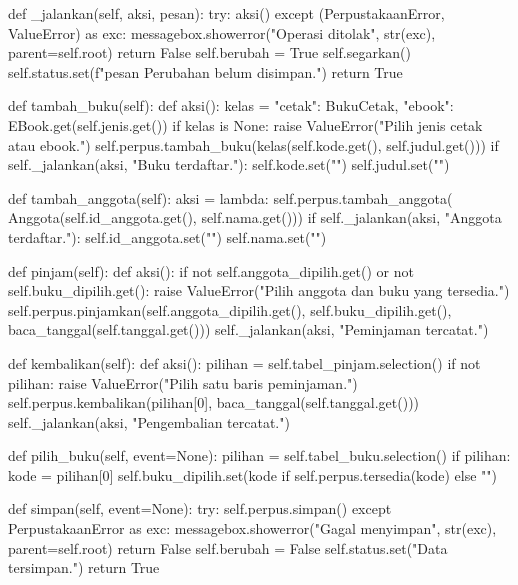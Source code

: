\begin{kode}[gui.py]
    def _jalankan(self, aksi, pesan):
        try:
            aksi()
        except (PerpustakaanError, ValueError) as exc:
            messagebox.showerror("Operasi ditolak", str(exc), parent=self.root)
            return False
        self.berubah = True
        self.segarkan()
        self.status.set(f"{pesan} Perubahan belum disimpan.")
        return True

    def tambah_buku(self):
        def aksi():
            kelas = {"cetak": BukuCetak, "ebook": EBook}.get(self.jenis.get())
            if kelas is None:
                raise ValueError("Pilih jenis cetak atau ebook.")
            self.perpus.tambah_buku(kelas(self.kode.get(), self.judul.get()))
        if self._jalankan(aksi, "Buku terdaftar."):
            self.kode.set("")
            self.judul.set("")

    def tambah_anggota(self):
        aksi = lambda: self.perpus.tambah_anggota(
            Anggota(self.id_anggota.get(), self.nama.get()))
        if self._jalankan(aksi, "Anggota terdaftar."):
            self.id_anggota.set("")
            self.nama.set("")

    def pinjam(self):
        def aksi():
            if not self.anggota_dipilih.get() or not self.buku_dipilih.get():
                raise ValueError("Pilih anggota dan buku yang tersedia.")
            self.perpus.pinjamkan(self.anggota_dipilih.get(),
                                  self.buku_dipilih.get(),
                                  baca_tanggal(self.tanggal.get()))
        self._jalankan(aksi, "Peminjaman tercatat.")

    def kembalikan(self):
        def aksi():
            pilihan = self.tabel_pinjam.selection()
            if not pilihan:
                raise ValueError("Pilih satu baris peminjaman.")
            self.perpus.kembalikan(pilihan[0], baca_tanggal(self.tanggal.get()))
        self._jalankan(aksi, "Pengembalian tercatat.")

    def pilih_buku(self, event=None):
        pilihan = self.tabel_buku.selection()
        if pilihan:
            kode = pilihan[0]
            self.buku_dipilih.set(kode if self.perpus.tersedia(kode) else "")

    def simpan(self, event=None):
        try:
            self.perpus.simpan()
        except PerpustakaanError as exc:
            messagebox.showerror("Gagal menyimpan", str(exc), parent=self.root)
            return False
        self.berubah = False
        self.status.set("Data tersimpan.")
        return True


\end{kode}

